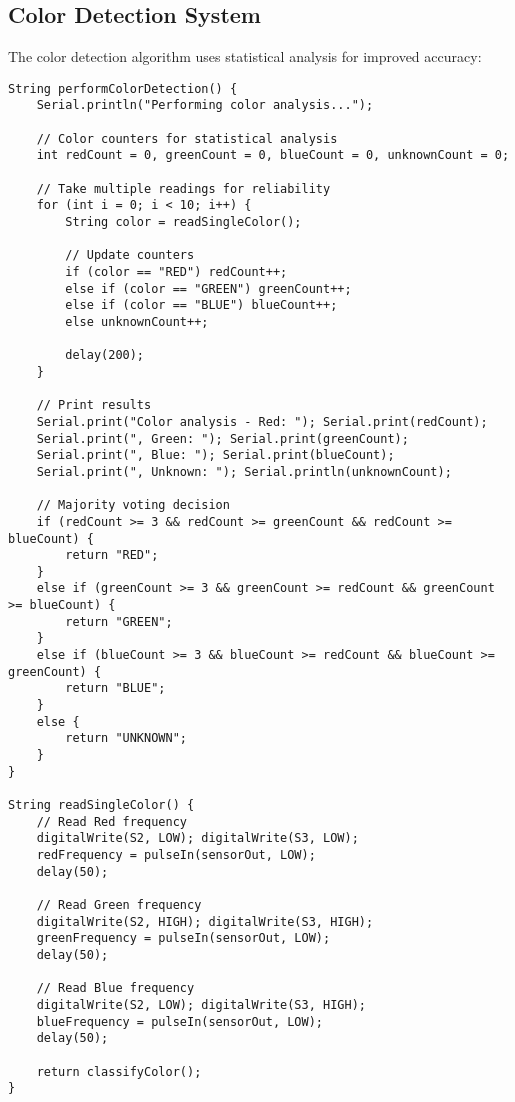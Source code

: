 \documentclass[12pt,a4paper]{article}
\begin{document}
\subsection{Color Detection System}

The color detection algorithm uses statistical analysis for improved accuracy:

\begin{lstlisting}[caption={Color Detection with Statistical Analysis}, label={lst:color}]
String performColorDetection() {
    Serial.println("Performing color analysis...");
    
    // Color counters for statistical analysis
    int redCount = 0, greenCount = 0, blueCount = 0, unknownCount = 0;
    
    // Take multiple readings for reliability
    for (int i = 0; i < 10; i++) {
        String color = readSingleColor();
        
        // Update counters
        if (color == "RED") redCount++;
        else if (color == "GREEN") greenCount++;
        else if (color == "BLUE") blueCount++;
        else unknownCount++;
        
        delay(200);
    }
    
    // Print results
    Serial.print("Color analysis - Red: "); Serial.print(redCount);
    Serial.print(", Green: "); Serial.print(greenCount);
    Serial.print(", Blue: "); Serial.print(blueCount);
    Serial.print(", Unknown: "); Serial.println(unknownCount);
    
    // Majority voting decision
    if (redCount >= 3 && redCount >= greenCount && redCount >= blueCount) {
        return "RED";
    }
    else if (greenCount >= 3 && greenCount >= redCount && greenCount >= blueCount) {
        return "GREEN";
    }
    else if (blueCount >= 3 && blueCount >= redCount && blueCount >= greenCount) {
        return "BLUE";
    }
    else {
        return "UNKNOWN";
    }
}

String readSingleColor() {
    // Read Red frequency
    digitalWrite(S2, LOW); digitalWrite(S3, LOW);
    redFrequency = pulseIn(sensorOut, LOW);
    delay(50);
    
    // Read Green frequency
    digitalWrite(S2, HIGH); digitalWrite(S3, HIGH);
    greenFrequency = pulseIn(sensorOut, LOW);
    delay(50);
    
    // Read Blue frequency
    digitalWrite(S2, LOW); digitalWrite(S3, HIGH);
    blueFrequency = pulseIn(sensorOut, LOW);
    delay(50);
    
    return classifyColor();
}
\end{lstlisting}
\end{document}
